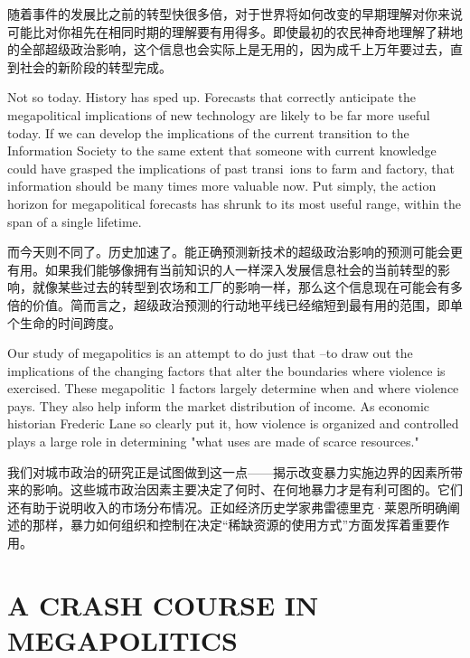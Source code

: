 \begin{Parallel}{97mm}{45mm}
  \ParallelRText
  {随着事件的发展比之前的转型快很多倍，对于世界将如何改变的早期理解对你来说可能比对你祖先在相同时期的理解要有用得多。即使最初的农民神奇地理解了耕地的全部超级政治影响，这个信息也会实际上是无用的，因为成千上万年要过去，直到社会的新阶段的转型完成。}
  \ParallelPar


  \ParallelLText
  {Not so today. History has sped up. Forecasts that correctly anticipate the megapolitical implications of new technology are likely to be far more useful today. If we can develop the implications of the current transition to the Information Society to the same extent that someone with current knowledge could have grasped the implications of past transi~ions to farm and factory, that information should be many times more valuable now. Put simply, the action horizon for megapolitical forecasts has shrunk to its most useful range, within the span of a single lifetime.}
  
  \ParallelRText
  {而今天则不同了。历史加速了。能正确预测新技术的超级政治影响的预测可能会更有用。如果我们能够像拥有当前知识的人一样深入发展信息社会的当前转型的影响，就像某些过去的转型到农场和工厂的影响一样，那么这个信息现在可能会有多倍的价值。简而言之，超级政治预测的行动地平线已经缩短到最有用的范围，即单个生命的时间跨度。}
  \ParallelPar


  \ParallelLText
  {Our study of megapolitics is an attempt to do just that --to draw out the implications of the changing factors that alter the boundaries where violence is exercised. These megapolitic~l factors largely determine when and where violence pays. They also help inform the market distribution of income. As economic historian Frederic Lane so clearly put it, how violence is organized and controlled plays a large role in determining "what uses are made of scarce resources." }
  
  \ParallelRText
  {我们对城市政治的研究正是试图做到这一点——揭示改变暴力实施边界的因素所带来的影响。这些城市政治因素主要决定了何时、在何地暴力才是有利可图的。它们还有助于说明收入的市场分布情况。正如经济历史学家弗雷德里克·莱恩所明确阐述的那样，暴力如何组织和控制在决定“稀缺资源的使用方式”方面发挥着重要作用。}
  \ParallelPar

  \section{A CRASH COURSE IN MEGAPOLITICS}


\end{Parallel}
